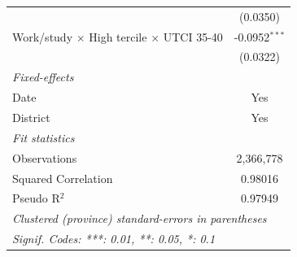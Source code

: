 \begin{table}[htbp]
\begin{tabular}{lc}
                                                                        & (0.0350)\\   
      Work/study $\times$ High tercile $\times$ UTCI 35-40              & -0.0952$^{***}$\\   
                                                                        & (0.0322)\\   
      \midrule
      \emph{Fixed-effects}\\
      Date                                                              & Yes\\  
      District                                                          & Yes\\  
      \midrule
      \emph{Fit statistics}\\
      Observations                                                      & 2,366,778\\  
      Squared Correlation                                               & 0.98016\\  
      Pseudo R$^2$                                                      & 0.97949\\  
      \midrule \midrule
      \multicolumn{2}{l}{\emph{Clustered (province) standard-errors in parentheses}}\\
      \multicolumn{2}{l}{\emph{Signif. Codes: ***: 0.01, **: 0.05, *: 0.1}}\\
   \end{tabular}
\end{table}


